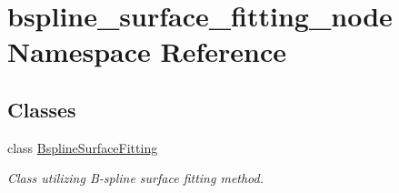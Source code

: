 \hypertarget{namespacebspline__surface__fitting__node}{}\section{bspline\+\_\+surface\+\_\+fitting\+\_\+node Namespace Reference}
\label{namespacebspline__surface__fitting__node}
\subsection*{Classes}
\begin{DoxyCompactItemize}
\item 
class \hyperlink{classbspline__surface__fitting__node_1_1_bspline_surface_fitting}{Bspline\+Surface\+Fitting}
\begin{DoxyCompactList}\small\item\em Class utilizing B-\/spline surface fitting method. \end{DoxyCompactList}\end{DoxyCompactItemize}
